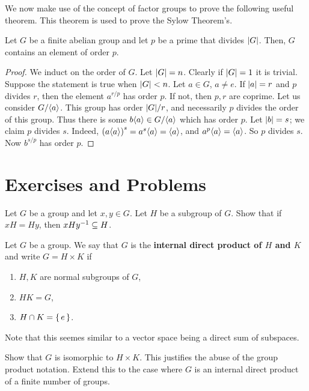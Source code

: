 \documentclass[./main.tex]{subfiles}
\begin{document}
We now make use of the concept of factor groups to prove the following useful
theorem. This theorem is used to prove the Sylow Theorem's.
\begin{theorem}
\label{thm:cauchy-thm-fin-abelian}
    Let $G$ be a finite abelian group and let $p$ be a prime that divides $\abs
    G$. Then, $G$ contains an element of order $p$.
\end{theorem}
\begin{proof}
    We induct on the order of $G$. Let $\abs G = n$. Clearly if $\abs G = 1$ it
    is trivial. Suppose the statement is true when $\abs G < n$. Let $a \in G$,
    $a \neq e$. If $\abs a = r$ and $p$ divides $r$, then the element $a^{r/p}$
    has order $p$. If not, then $p, r$ are coprime. Let us consider $G/{ \langle a \rangle }$.
    This group has order $\abs G / r$, and necessarily $p$ divides the order of
    this group. Thus there is some $b { \langle a \rangle } \in G/{ \langle a \rangle }$ which has order $p$.
    Let $\abs b = s$; we claim $p$ divides $s$. Indeed, $\paren{a \gen{a}}^s =
    a^s \gen a = \gen a$, and $a^p { \langle a \rangle } = { \langle a \rangle }$. So $p$ divides $s$. Now
    $b^{s/p}$ has order $p$.
\end{proof}

\section{Exercises and Problems}

\begin{exercise}
    Let $G$ be a group and let $x, y \in G$. Let $H$ be a subgroup of $G$. Show
    that if $xH = Hy$, then $xHy^{-1} \subseteq H$. 
\end{exercise}

\begin{exercise}
\label{ex:internal-direct-products}
    Let $G$ be a group. We say that $G$ is the \textbf{internal direct product
    of $H$ and $K$} and write $G = H \times K$ if
    \begin{enumerate}
        \item $H, K$ are normal subgroups of $G$,
        \item $HK = G$,
        \item $H \cap K = \set{e}$.
    \end{enumerate}
    Note that this seemes similar to a vector space being a direct sum of
    subspaces. 

    Show that $G$ is isomorphic to $H \times K$. This justifies the abuse of the
    group product notation. Extend this to the case where $G$ is an internal
    direct product of a finite number of groups.
\end{exercise}
\end{document}
